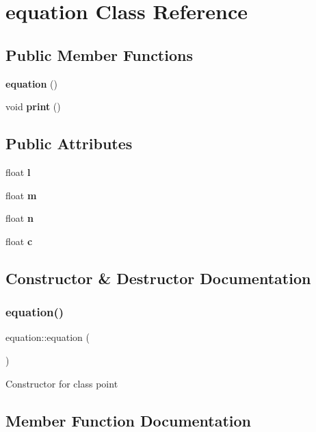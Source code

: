 \section{equation Class Reference}
\label{classequation}
\subsection*{Public Member Functions}
\begin{DoxyCompactItemize}
\item 
\textbf{ equation} ()
\item 
void \textbf{ print} ()
\end{DoxyCompactItemize}
\subsection*{Public Attributes}
\begin{DoxyCompactItemize}
\item 
float \textbf{ l}
\item 
float \textbf{ m}
\item 
float \textbf{ n}
\item 
float \textbf{ c}
\end{DoxyCompactItemize}


\subsection{Constructor \& Destructor Documentation}
\mbox{\label{classequation_a52131cd0f9bff52aef027d13205049e9}} 
\subsubsection{equation()}
{\footnotesize\ttfamily equation\+::equation (\begin{DoxyParamCaption}{ }\end{DoxyParamCaption})\hspace{0.3cm}{\ttfamily [inline]}}

Constructor for class point 

\subsection{Member Function Documentation}
\mbox{\label{classequation_a5b1d0c905f6e4755e1baa3d185df8e66}} 
